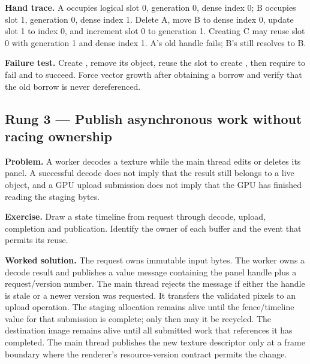 \textbf{Hand trace.} A occupies logical slot 0, generation 0, dense index 0; B occupies slot 1, generation 0, dense index 1. Delete A, move B to dense index 0, update slot 1 to index 0, and increment slot 0 to generation 1. Creating C may reuse slot 0 with generation 1 and dense index 1. A's old  handle fails; B's  still resolves to B.

\textbf{Failure test.} Create , remove its object, reuse the slot to create , then require  to fail and  to succeed. Force vector growth after obtaining a borrow and verify that the old borrow is never dereferenced.

\subsection{Rung 3 --- Publish asynchronous work without racing ownership}\label{02-foundations-ii-ch038-rung-3-publish-asynchronous-work-without-racing-ownership}

\hypertarget{02-foundations-ii-ch038-rung-3-publish-asynchronous-work-without-racing-ownership}{}

\textbf{Problem.} A worker decodes a texture while the main thread edits or deletes its panel. A successful decode does not imply that the result still belongs to a live object, and a GPU upload submission does not imply that the GPU has finished reading the staging bytes.

\textbf{Exercise.} Draw a state timeline from request through decode, upload, completion and publication. Identify the owner of each buffer and the event that permits its reuse.

\textbf{Worked solution.} The request owns immutable input bytes. The worker owns a decode result and publishes a value message containing the panel handle plus a request/version number. The main thread rejects the message if either the handle is stale or a newer version was requested. It transfers the validated pixels to an upload operation. The staging allocation remains alive until the fence/timeline value for that submission is complete; only then may it be recycled. The destination image remains alive until all submitted work that references it has completed. The main thread publishes the new texture descriptor only at a frame boundary where the renderer's resource-version contract permits the change.

